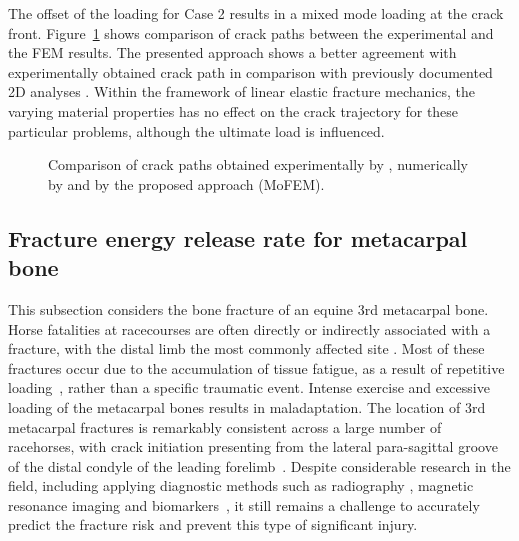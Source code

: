 \documentclass[onecolumn]{svjour3}
\begin{document}
The offset of the loading for Case 2 results in a mixed mode loading at the crack front.
Figure~\ref{fig:fgm_crack_path_comapre} shows comparison of crack paths between the experimental and the FEM results. The presented approach shows a better agreement with experimentally obtained crack path in comparison with previously documented 2D analyses \cite{kim2004simulation}. 
Within the framework of linear elastic fracture mechanics, the varying material properties has no effect on the crack trajectory for these particular problems, although the ultimate load is influenced.
% 
\begin{figure}
		\centering
		\caption{Comparison of crack paths obtained experimentally by \cite{galvez1996crack}, numerically by \citep{kim2004simulation} and by the proposed approach (MoFEM).}
		\label{fig:fgm_crack_path_comapre}
\end{figure}
% 
% 
\subsection{Fracture energy release rate for metacarpal bone} 
\label{sec:mc3_release_eng}
% 
This subsection considers the bone fracture of an equine 3rd metacarpal bone. 
Horse fatalities at racecourses are often directly or indirectly associated with a fracture, with the distal limb the most commonly affected site \cite{parkin2004risk}.
Most of these fractures occur due to the accumulation of tissue fatigue, as a result of repetitive loading~\cite{Parkin2005}, rather than a specific traumatic event. 
Intense exercise and excessive loading of the metacarpal bones results in maladaptation. 
The location of 3rd metacarpal fractures is remarkably consistent across a large number of racehorses,  with crack initiation presenting from 
the lateral para-sagittal groove of the distal condyle of the leading forelimb~\cite{jacklin2012frequency, parkin2006analysis}.
Despite considerable research in the field, including applying diagnostic methods such as radiography 
\cite{bogers2016quantitative, crijns2014intramodality, loughridge2017qualitative}, magnetic resonance imaging 
\cite{tranquille2017MRI} and biomarkers~\cite{mcilwraith2005use}, it still remains a challenge to accurately predict the fracture risk and prevent this type of significant injury.
\end{document}
